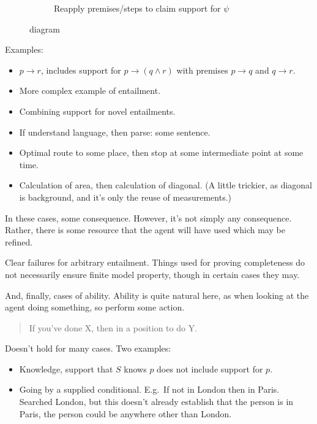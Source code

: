 \begin{note}
\begin{figure}[H]
\begin{subfigure}{.45\textwidth}
      \caption{Reapply premises/steps to claim support for \(\psi\)}
    \end{subfigure}
    \caption{\incl{} diagram}
  \end{figure}

  Examples:
  \begin{itemize}
  \item \(p \rightarrow r\), includes support for \(p \rightarrow (q \land r)\) with premises \(p \rightarrow q\) and \(q \rightarrow r\).
  \item More complex example of entailment.
  \item Combining support for novel entailments.
  \item If understand language, then parse: some sentence.
  \item Optimal route to some place, then stop at some intermediate point at some time.
  \item Calculation of area, then calculation of diagonal. (A little trickier, as diagonal is background, and it's only the reuse of measurements.)
  \end{itemize}
  In these cases, some consequence.
  However, it's not simply any consequence.
  Rather, there is some resource that the agent will have used which may be refined.

  Clear failures for arbitrary entailment.
  Things used for proving completeness do not necessarily ensure finite model property, though in certain cases they may.

  And, finally, cases of ability.
  Ability is quite natural here, as when looking at the agent doing something, so perform some action.

  \begin{quote}
    If you've done X, then in a position to do Y.
  \end{quote}

  Doesn't hold for many cases.
  Two examples:
  \begin{itemize}
  \item Knowledge, support that \(S\) knows \(p\) does not include support for \(p\).
  \item Going by a supplied conditional.
    E.g.\ If not in London then in Paris.
    Searched London, but this doesn't already establish that the person is in Paris, the person could be anywhere other than London.
  \end{itemize}
\end{note}

